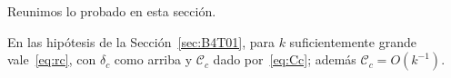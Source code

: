 Reunimos lo probado en esta sección.
\begin{lemasub}\label{lem:escalar}
En las hipótesis de la Sección~\ref{sec:B4T01}, para $k$ suficientemente grande vale~\eqref{eq:rc},
con $\delta_c$ como arriba y $\mathcal C_c$ dado por~\eqref{eq:Cc}; además $\mathcal C_c=O(k^{-1})$.
\end{lemasub}
